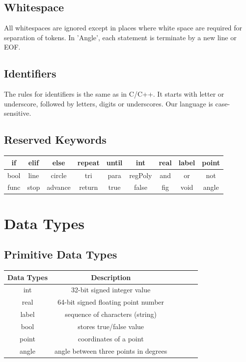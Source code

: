 \documentclass[12pt]{article}
\begin{document}
\subsection{Whitespace}
All whitespaces are ignored except in places where white space are required for separation of tokens.
In 'Angle', each statement is terminate by a new line or EOF.

\subsection{Identifiers}
The rules for identifiers is the same as in C/C++.
It starts with letter or underscore, followed by letters, digits or underscores. Our language is case-sensitive.

\subsection{Reserved Keywords}
\begin{center}
\begin{tabular}{ | c | c | c| c | c |c|c|c|c|} 
  \hline
  if & elif & else & repeat & until & int  & real & label & point \\ 
  \hline
   bool & line & circle & tri & para & regPoly & and & or & not\\ 
  \hline
  func & stop & advance & return & true & false & fig & void & angle\\
  \hline
  
\end{tabular}
\end{center}


\section{Data Types}

\subsection{Primitive Data Types}
\begin{center}
\begin{tabular}{ | c | c | c| c | c |c|} 
  \hline
  Data Types & Description \\ 
  \hline
  int & 32-bit signed integer value \\
 real & 64-bit signed floating point number \\
 label & sequence of characters (string) \\
 bool & stores true/false value\\
 point &  coordinates of a point  \\
angle & angle between three points in degrees \\
\hline
\end{tabular}
\end{center}
\end{document}
